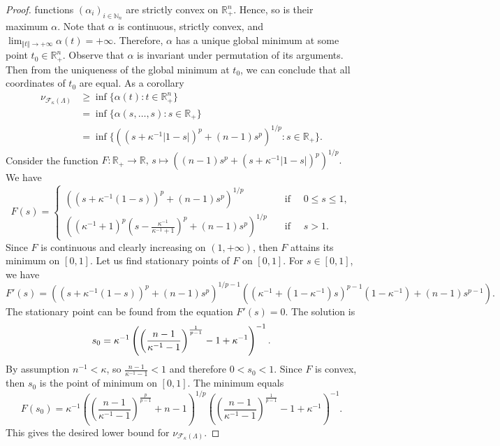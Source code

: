 \documentclass[12pt]{article}
\begin{document}
\begin{proof}
    functions $(\alpha_i)_{i\in\mathbb{N}_n}$ are strictly convex 
    on $\mathbb{R}_+^n$. Hence, so is their maximum $\alpha$. Note 
    that $\alpha$ is continuous, strictly convex, 
    and $\lim_{\Vert t\Vert\to+\infty}\alpha(t)=+\infty$. Therefore, $\alpha$ 
    has a unique global minimum at some point $t_0\in\mathbb{R}_+^n$. Observe 
    that $\alpha$ is invariant under permutation of its arguments. Then from 
    the uniqueness of the global minimum at $t_0$, we can conclude that all 
    coordinates of $t_0$ are equal. As a corollary
    \[
    \begin{aligned}
        \nu_{\mathcal{F}_{\kappa}(\Lambda)}
        &\geq\inf\{\alpha(t) : t\in\mathbb{R}_+^n\} \\
        &=\inf\{\alpha(s,\ldots,s) : s\in\mathbb{R}_+\} \\
        &=\inf\{((s+\kappa^{-1}|1-s|)^p+(n-1)s^p)^{1/p} : s\in\mathbb{R}_+\}.
    \end{aligned}
    \]
    Consider the function
    $
        F:\mathbb{R}_+\to\mathbb{R},\,
        s\mapsto ((n-1)s^p+(s+\kappa^{-1}|1-s|)^p)^{1/p}.
    $
    We have 
    \[
        F(s)=
        \begin{cases}
            ((s+\kappa^{-1}(1-s))^p+(n-1)s^p)^{1/p}
            \quad&\text{if }\quad 0\leq s\leq 1, \\
            \left(
                (\kappa^{-1}+1)^p
                \left(s-\frac{\kappa^{-1}}{\kappa^{-1}+1}\right)^p+
                (n-1)s^p
            \right)^{1/p}
            \quad&\text{if }\quad s>1.
        \end{cases}
    \]
    Since $F$ is continuous and clearly increasing on $(1,+\infty)$, then $F$ 
    attains its minimum on $[0, 1]$. Let us find stationary points 
    of $F$ on $[0, 1]$. For $s\in[0,1]$, we have
    \[
        F'(s)=
        ((s+\kappa^{-1}(1-s))^p+(n-1)s^p)^{1/p-1}
        ((\kappa^{-1}+(1-\kappa^{-1})s)^{p-1}(1-\kappa^{-1})+(n-1)s^{p-1}).
    \]
    The stationary point can be found from the equation $F'(s)=0$. 
    The solution is
    \[
        s_0
        =
        \kappa^{-1}
        \left(
            \left(
                \frac{n-1}{\kappa^{-1}-1}
            \right)^{\frac{1}{p-1}}
            -1+\kappa^{-1}
        \right)^{-1}.\\
    \]
    By assumption $n^{-1}<\kappa$, so $\frac{n-1}{\kappa^{-1}-1}<1$ and 
    therefore $0<s_0<1$. Since $F$ is convex, then $s_0$ is the point of 
    minimum on $[0,1]$. The minimum equals
    \[
        F(s_0)
        =\kappa^{-1}
        \left(
            \left(\frac{n-1}{\kappa^{-1}-1}
            \right)^{\frac{p}{p-1}}
            +n-1
        \right)^{1/p}
        \left(
            \left(\frac{n-1}{\kappa^{-1}-1}
            \right)^{\frac{1}{p-1}}
            -1+\kappa^{-1}
        \right)^{-1}.
    \]
    This gives the desired lower bound 
    for $\nu_{\mathcal{F}_{\kappa}(\Lambda)}$.
\end{proof}
\end{document}
